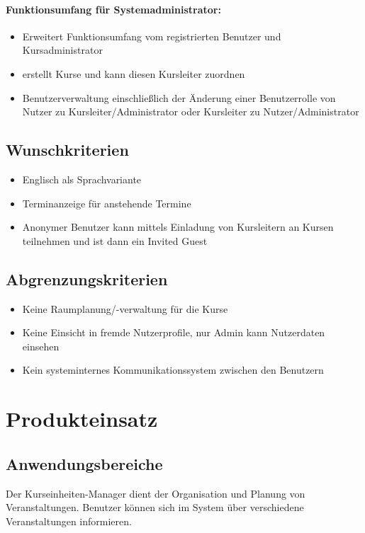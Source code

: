 \documentclass[a4paper]{scrreprt}
\begin{document}
		\subsubsection{Funktionsumfang für Systemadministrator:}
			\begin{itemize}
			\item Erweitert Funktionsumfang vom \glqq registrierten Benutzer\grqq{} und \glqq Kursadministrator\grqq
			\item erstellt Kurse und kann diesen Kursleiter zuordnen
			\item Benutzerverwaltung einschließlich der Änderung einer Benutzerrolle von Nutzer zu Kursleiter/Administrator oder Kursleiter zu Nutzer/Administrator
			\end{itemize}
			
    \section{Wunschkriterien}
			\begin{itemize}
			\item Englisch als Sprachvariante
			\item Terminanzeige für anstehende Termine
       		\item Anonymer Benutzer kann mittels Einladung von Kursleitern an Kursen teilnehmen und ist dann ein \glqq Invited Guest\grqq{}
			\end{itemize}
		\section{Abgrenzungskriterien}
     		\begin{itemize}
     		\item Keine Raumplanung/-verwaltung für die Kurse
     		\item Keine Einsicht in fremde Nutzerprofile, nur Admin kann Nutzerdaten einsehen
     		\item Kein systeminternes Kommunikationssystem zwischen den Benutzern
     		\end{itemize}
        
  
\chapter{Produkteinsatz}
    \section{Anwendungsbereiche}
		 Der Kurseinheiten-Manager dient der Organisation und Planung von Veranstaltungen. Benutzer können sich im System über verschiedene Veranstaltungen informieren.   
     
\end{document}
